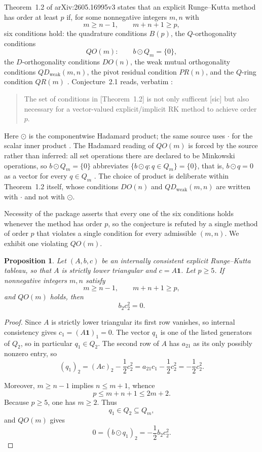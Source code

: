\documentclass[11pt]{amsart}
\newtheorem{proposition}[theorem]{Proposition}
\begin{document}
Theorem~1.2 of arXiv:2605.16995v3 states that an explicit Runge--Kutta
method has order at least \(p\) if, for some nonnegative integers \(m,n\)
with
\[
m\ge n-1,
\qquad
m+n+1\ge p,
\]
six conditions hold: the quadrature conditions \(B(p)\), the
\(Q\)-orthogonality conditions
\[
QO(m):
\qquad
b\odot Q_m=\{0\},
\]
the \(D\)-orthogonality conditions \(DO(n)\), the weak mutual
orthogonality conditions \(QD_{\mathrm{weak}}(m,n)\), the pivot residual
condition \(PR(n)\), and the \(Q\)-ring condition \(QR(m)\)
\cite[Thm.~1.2]{HeHuangDetails}. Conjecture~2.1 reads, verbatim
\cite[Conj.~2.1]{HeHuangDetails}:
\begin{quote}
The set of conditions in [Theorem~1.2] is not only sufficent [sic] but also
necessary for a vector-valued explicit/implicit RK method to achieve order
\(p\).
\end{quote}
Here \(\odot\) is the componentwise Hadamard product; the same source
uses \(\cdot\) for the scalar inner product
\cite[Notations~2.1 and 2.3]{HeHuangTheory}.
The Hadamard reading of \(QO(m)\) is forced by the source rather than
inferred: all set operations there are declared to be Minkowski
operations, so \(b\odot Q_m=\{0\}\) abbreviates
\(\{b\odot q:q\in Q_m\}=\{0\}\), that is, \(b\odot q=0\) as a vector for
every \(q\in Q_m\) \cite[Notation~2.5]{HeHuangTheory}. The choice of
product is deliberate within Theorem~1.2 itself, whose conditions
\(DO(n)\) and \(QD_{\mathrm{weak}}(m,n)\) are written with \(\cdot\) and
not with \(\odot\).

Necessity of the package asserts that every one of the six conditions
holds whenever the method has order \(p\), so the conjecture is refuted
by a single method of order \(p\) that violates a single condition for
every admissible \((m,n)\). We exhibit one violating \(QO(m)\).

\begin{proposition}\label{prop:obstruction}
Let \((A,b,c)\) be an internally consistent explicit Runge--Kutta
tableau, so that \(A\) is strictly lower triangular and
\(c=A\mathbf 1\). Let \(p\ge 5\). If nonnegative integers \(m,n\)
satisfy
\[
m\ge n-1,
\qquad
m+n+1\ge p,
\]
and \(QO(m)\) holds, then
\[
b_2c_2^2=0.
\]
\end{proposition}

\begin{proof}
Since \(A\) is strictly lower triangular its first row vanishes, so internal
consistency gives \(c_1=(A\mathbf 1)_1=0\). The vector \(q_1\) is one of the
listed generators of \(Q_2\), so in particular \(q_1\in Q_2\). The second
row of \(A\) has \(a_{21}\) as its only possibly nonzero entry, so
\[
(q_1)_2
 =(Ac)_2-\frac12c_2^2
 =a_{21}c_1-\frac12c_2^2
 =-\frac12c_2^2.
\]

Moreover, \(m\ge n-1\) implies \(n\le m+1\), whence
\[
p\le m+n+1\le 2m+2.
\]
Because \(p\ge 5\), one has \(m\ge 2\). Thus
\[
q_1\in Q_2\subseteq Q_m,
\]
and \(QO(m)\) gives
\[
0=(b\odot q_1)_2
  =-\frac12b_2c_2^2.
\]
\end{proof}
\end{document}

